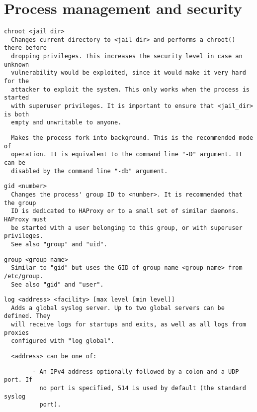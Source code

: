 
\section{Process management and security}
\begin{verbatim}
chroot <jail dir>
  Changes current directory to <jail dir> and performs a chroot() there before
  dropping privileges. This increases the security level in case an unknown
  vulnerability would be exploited, since it would make it very hard for the
  attacker to exploit the system. This only works when the process is started
  with superuser privileges. It is important to ensure that <jail_dir> is both
  empty and unwritable to anyone.
\end{verbatim}

\begin{verbatim}
  Makes the process fork into background. This is the recommended mode of
  operation. It is equivalent to the command line "-D" argument. It can be
  disabled by the command line "-db" argument.
\end{verbatim}

\begin{verbatim}
gid <number>
  Changes the process' group ID to <number>. It is recommended that the group
  ID is dedicated to HAProxy or to a small set of similar daemons. HAProxy must
  be started with a user belonging to this group, or with superuser privileges.
  See also "group" and "uid".
\end{verbatim}

\begin{verbatim}
group <group name>
  Similar to "gid" but uses the GID of group name <group name> from /etc/group.
  See also "gid" and "user".
\end{verbatim}

\begin{verbatim}
log <address> <facility> [max level [min level]]
  Adds a global syslog server. Up to two global servers can be defined. They
  will receive logs for startups and exits, as well as all logs from proxies
  configured with "log global".
\end{verbatim}

\begin{verbatim}
  <address> can be one of:
\end{verbatim}

\begin{verbatim}
        - An IPv4 address optionally followed by a colon and a UDP port. If
          no port is specified, 514 is used by default (the standard syslog
          port).
\end{verbatim}

